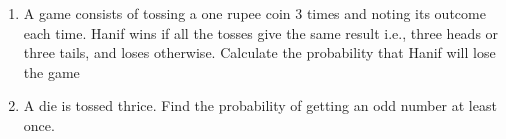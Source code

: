 \begin{enumerate}[label=\thechapter.\arabic*,ref=\thechapter.\theenumi]
	\item 
	A game consists of tossing a one rupee coin 3 times and noting its outcome each time. Hanif wins if all the tosses give the same result i.e., three heads or three tails, and loses otherwise. Calculate the probability that Hanif will lose the game
\\
%
\item A die is tossed thrice. Find the probability of getting an odd number at least once.
		\label{ncert/12/13/2/11}
\end{enumerate}
